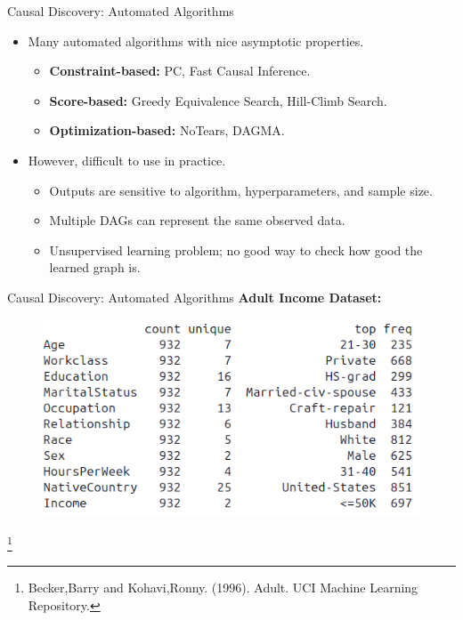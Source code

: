 \documentclass[aspectratio=169]{beamer}
\newcommand\blfootnote[1]{
    \begingroup
    \renewcommand\thefootnote{}\footnote{#1}
    \addtocounter{footnote}{-1}
    \endgroup
}
\begin{document}
\begin{frame}{Causal Discovery: Automated Algorithms}
	\begin{itemize}
		\item Many automated algorithms with nice asymptotic properties.
			\begin{itemize}
				\item \textbf{Constraint-based:} PC, Fast Causal Inference.
				\item \textbf{Score-based:} Greedy Equivalence Search, Hill-Climb Search.
				\item \textbf{Optimization-based:} NoTears, DAGMA.
			\end{itemize}
		\item However, difficult to use in practice.
			\begin{itemize}
				\item Outputs are sensitive to algorithm, hyperparameters, and sample size.
				\item Multiple DAGs can represent the same observed data.
				\item Unsupervised learning problem; no good way to check how good the learned graph is.
			\end{itemize}
	\end{itemize}
\end{frame}

\begin{frame}{Causal Discovery: Automated Algorithms}
	\textbf{Adult Income Dataset:}
	\vspace{2em}
	\begin{figure}
		\center
		\includegraphics[scale=0.5]{imgs/adult_describe.png}
	\end{figure}
	\blfootnote{Becker,Barry and Kohavi,Ronny. (1996). Adult. UCI Machine Learning Repository.}
\end{frame}
\end{document}
